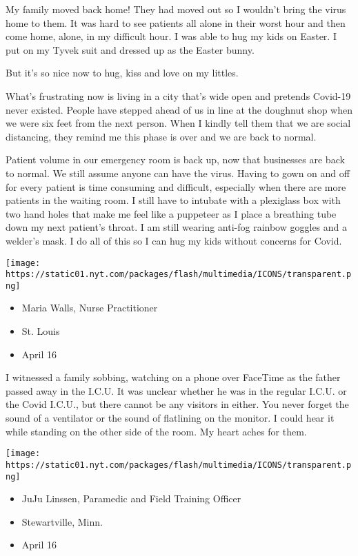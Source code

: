 My family moved back home! They had moved out so I wouldn't bring the
virus home to them. It was hard to see patients all alone in their worst
hour and then come home, alone, in my difficult hour. I was able to hug
my kids on Easter. I put on my Tyvek suit and dressed up as the Easter
bunny.

But it's so nice now to hug, kiss and love on my littles.

What's frustrating now is living in a city that's wide open and pretends
Covid-19 never existed. People have stepped ahead of us in line at the
doughnut shop when we were six feet from the next person. When I kindly
tell them that we are social distancing, they remind me this phase is
over and we are back to normal.

Patient volume in our emergency room is back up, now that businesses are
back to normal. We still assume anyone can have the virus. Having to
gown on and off for every patient is time consuming and difficult,
especially when there are more patients in the waiting room. I still
have to intubate with a plexiglass box with two hand holes that make me
feel like a puppeteer as I place a breathing tube down my next patient's
throat. I am still wearing anti-fog rainbow goggles and a welder's mask.
I do all of this so I can hug my kids without concerns for Covid.

\texttt{[image: https://static01.nyt.com/packages/flash/multimedia/ICONS/transparent.png]}

\begin{itemize}
\tightlist
\item
  Maria Walls, Nurse Practitioner
\item
  St. Louis
\item
  April 16
\end{itemize}

I witnessed a family sobbing, watching on a phone over FaceTime as the
father passed away in the I.C.U. It was unclear whether he was in the
regular I.C.U. or the Covid I.C.U., but there cannot be any visitors in
either. You never forget the sound of a ventilator or the sound of
flatlining on the monitor. I could hear it while standing on the other
side of the room. My heart aches for them.

\texttt{[image: https://static01.nyt.com/packages/flash/multimedia/ICONS/transparent.png]}

\begin{itemize}
\tightlist
\item
  JuJu Linssen, Paramedic and Field Training Officer
\item
  Stewartville, Minn.
\item
  April 16
\end{itemize}

